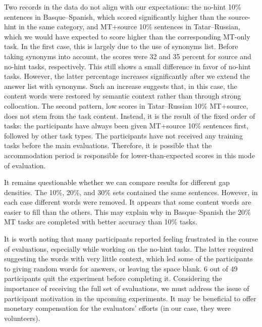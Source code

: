 \documentclass[11pt]{article}
\newcommand{\comment}[1]{}
\begin{document}
Two records in the data do not align with our expectations: the no-hint 10\% sentences in Basque--Spanish, which scored significantly higher than the source-hint in the same category, and MT+source 10\% sentences in Tatar--Russian, which we would have expected to score higher than the corresponding MT-only task. In the first case, this is largely due to the use of synonyms list. Before taking synonyms into account, the scores were 32 and 35 percent for source and no-hint tasks, respectively. This still shows a small difference in favor of no-hint tasks. However, the latter percentage increases significantly after we extend the answer list with synonyms. Such an increase suggests that, in this case, the content words were restored by 
semantic context rather than through strong collocation. The second pattern, low scores in Tatar--Russian 10\% MT+source, does not stem from the task content. Instead, it is the result of the fixed order of tasks: the participants have always been given MT+source 10\% sentences first, followed by other task types. The participants have not received any training tasks before the main evaluations. Therefore, it is possible that the accommodation period is responsible for lower-than-expected scores in this mode of evaluation. 

It remains questionable whether we can compare results for different gap densities. The 10\%, 20\%, and 30\% sets contained the same sentences. However, in each case different words were removed. It appears
that some content words are easier to fill than the others. This may explain why in
Basque--Spanish the 20\% MT tasks are completed with better accuracy than 10\% tasks.\comment{MLF: I think this shows that our statistics are weak, should we say something to excuse ourselves?}

It is worth noting that many participants reported feeling frustrated in
the course of evaluations, especially while working on the no-hint tasks. The latter required suggesting the words with very little context, which led some of the participants to giving random words for answers, or leaving the space blank. 6 out of 49
participants quit the experiment before completing it. Considering the importance of receiving the full set of evaluations, we must address the issue of participant motivation in the upcoming experiments. It may be beneficial to offer monetary compensation for the evaluators' efforts (in our case, they were volunteers).
\end{document}
